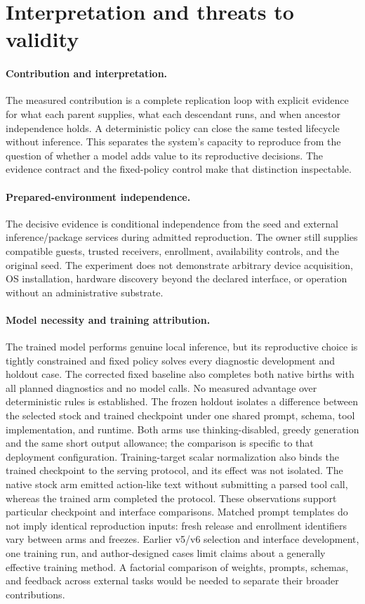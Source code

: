 \documentclass[11pt,letterpaper]{article}
\begin{document}
\section{Interpretation and threats to validity}

\paragraph{Contribution and interpretation.}
The measured contribution is a complete replication loop with explicit evidence
for what each parent supplies, what each descendant runs, and when ancestor
independence holds. A deterministic policy can close the same tested lifecycle
without inference. This separates the system's capacity to reproduce from the
question of whether a model adds value to its reproductive decisions. The
evidence contract and the fixed-policy control make that distinction inspectable.

\paragraph{Prepared-environment independence.}
The decisive evidence is conditional independence from the seed and external
inference/package services during admitted reproduction. The owner still
supplies compatible guests, trusted receivers, enrollment, availability
controls, and the original seed. The experiment does not demonstrate arbitrary
device acquisition, OS installation, hardware discovery beyond the declared
interface, or operation without an administrative substrate.

\paragraph{Model necessity and training attribution.}
The trained model performs genuine local inference, but its reproductive choice
is tightly constrained and fixed policy solves every diagnostic development
and holdout case. The corrected fixed baseline also completes both native births
with all planned diagnostics and no model calls. No measured advantage over
deterministic rules is established.
The frozen holdout isolates a difference between the selected stock and trained
checkpoint under one shared prompt, schema, tool implementation, and runtime.
Both arms use thinking-disabled, greedy generation and the same short output
allowance; the comparison is specific to that deployment configuration.
Training-target scalar normalization also binds the trained checkpoint to the
serving protocol, and its effect was not isolated. The native stock arm emitted action-like text without submitting a parsed
tool call, whereas the trained arm completed the protocol. These observations
support particular checkpoint and interface comparisons. Matched prompt
templates do not imply identical reproduction inputs: fresh release and
enrollment identifiers vary between arms and freezes. Earlier v5/v6 selection and
interface development, one training run, and author-designed cases limit claims
about a generally effective training method. A factorial comparison of weights,
prompts, schemas, and feedback across external tasks would be needed to separate
their broader contributions.
\end{document}
